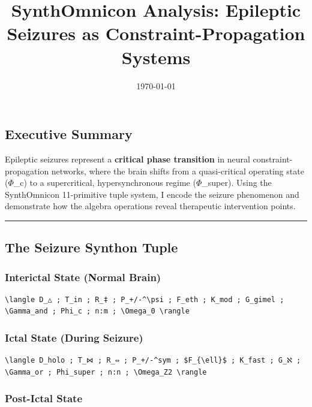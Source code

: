 \documentclass[12pt,a4paper]{article}
\begin{document}
\title{SynthOmnicon Analysis: Epileptic Seizures as Constraint-Propagation Systems}
\date{\today}

\maketitle

\subsection{Executive Summary}

Epileptic seizures represent a \textbf{critical phase transition} in neural constraint-propagation networks, where the brain shifts from a quasi-critical operating state ($\Phi$\_c) to a supercritical, hypersynchronous regime ($\Phi$\_super). Using the SynthOmnicon 11-primitive tuple system, I encode the seizure phenomenon and demonstrate how the algebra operations reveal therapeutic intervention points.

\begin{center}
\rule{0.5\textwidth}{0.4pt}
\end{center}

\subsection{The Seizure Synthon Tuple}

\subsubsection{\textbf{Interictal State (Normal Brain)}}

\begin{lstlisting}
\langle D_△ ; T_in ; R_‡ ; P_+/-^\psi ; F_eth ; K_mod ; G_gimel ; \Gamma_and ; Phi_c ; n:m ; \Omega_0 \rangle
\end{lstlisting}

\subsubsection{\textbf{Ictal State (During Seizure)}}

\begin{lstlisting}
\langle D_holo ; T_⋈ ; R_⇔ ; P_+/-^sym ; $F_{\ell}$ ; K_fast ; G_ℵ ; \Gamma_or ; Phi_super ; n:n ; \Omega_Z2 \rangle
\end{lstlisting}

\subsubsection{\textbf{Post-Ictal State}}
\end{document}
